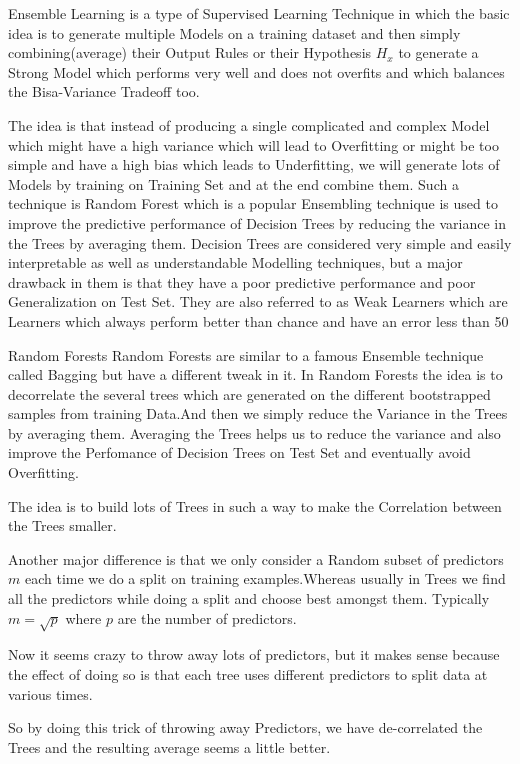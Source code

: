 Ensemble Learning is a type of Supervised Learning Technique in which the basic idea is to generate multiple Models on a training dataset and then simply combining(average) their Output Rules or their Hypothesis \( H_x \) to generate a Strong Model which performs very well and does not overfits and which balances the Bisa-Variance Tradeoff too.

The idea is that instead of producing a single complicated and complex Model which might have a high variance which will lead to Overfitting or might be too simple and have a high bias which leads to Underfitting, we will generate lots of Models by training on Training Set and at the end combine them. Such a technique is Random Forest which is a popular Ensembling technique is used to improve the predictive performance of Decision Trees by reducing the variance in the Trees by averaging them. Decision Trees are considered very simple and easily interpretable as well as understandable Modelling techniques, but a major drawback in them is that they have a poor predictive performance and poor Generalization on Test Set. They are also referred to as Weak Learners which are Learners which always perform better than chance and have an error less than 50 %

Random Forests
Random Forests are similar to a famous Ensemble technique called Bagging but have a different tweak in it. In Random Forests the idea is to decorrelate the several trees which are generated on the different bootstrapped samples from training Data.And then we simply reduce the Variance in the Trees by averaging them.
Averaging the Trees helps us to reduce the variance and also improve the Perfomance of Decision Trees on Test Set and eventually avoid Overfitting.

The idea is to build lots of Trees in such a way to make the Correlation between the Trees smaller.

Another major difference is that we only consider a Random subset of predictors \( m \) each time we do a split on training examples.Whereas usually in Trees we find all the predictors while doing a split and choose best amongst them. Typically \( m=\sqrt{p} \) where \(p\) are the number of predictors.

Now it seems crazy to throw away lots of predictors, but it makes sense because the effect of doing so is that each tree uses different predictors to split data at various times.

So by doing this trick of throwing away Predictors, we have de-correlated the Trees and the resulting average seems a little better.


